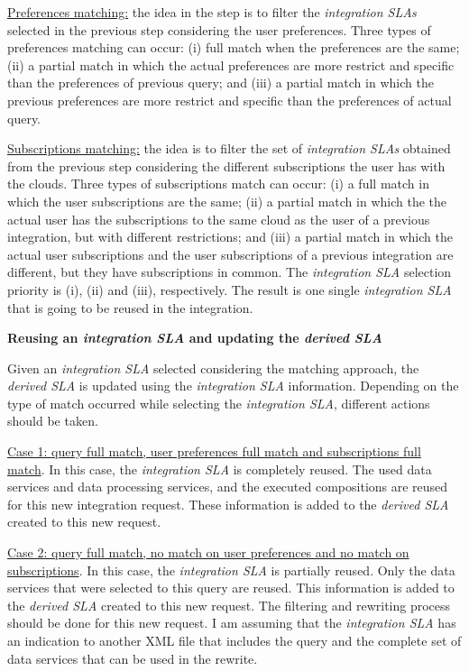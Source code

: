 \documentclass[10pt,a4paper,final]{report}
\begin{document}
\noindent \underline{Preferences matching:} the idea in the step is to filter the \textsl{integration SLAs} selected in the previous step considering the user preferences. Three types of preferences matching can occur: (i) full match when the preferences are the same; (ii) a partial match in which the actual preferences are more restrict and specific than the preferences of previous query; and (iii) a partial match in which the previous preferences are more restrict and specific than the preferences of actual query.
\bigskip

\noindent \underline{Subscriptions matching:} the idea is to filter the set of \textsl{integration SLAs} obtained from the previous step considering the different subscriptions the user has with the clouds. Three types of subscriptions match can occur: (i) a full match in which the user subscriptions are the same; (ii) a partial match in which the the actual user has the subscriptions to the same cloud as the user of a previous integration, but with different restrictions; and (iii) a partial match in which the actual user subscriptions and the user subscriptions of a previous integration are different, but they have subscriptions in common. The \textsl{integration SLA} selection priority is (i), (ii) and (iii), respectively. The result is one single \textsl{integration SLA} that is going to be reused in the integration.
\bigskip

\noindent \textbf{Reusing an \textsl{integration SLA} and updating the \textsl{derived SLA}}
\bigskip

Given an \textsl{integration SLA} selected considering the matching approach, the \textsl{derived SLA} is updated using the \textsl{integration SLA} information. Depending on the type of match occurred while selecting the \textsl{integration SLA}, different actions should be taken.
\bigskip

\noindent \underline{Case 1: query full match, user preferences full match and subscriptions full match}. In this case, the \textsl{integration SLA} is completely reused. The used data services and data processing services, and the executed compositions are reused for this new integration request. These information is added to the \textsl{derived SLA} created to this new request.
\bigskip

\noindent \underline{Case 2: query full match, no match on user preferences and no match on subscriptions}. In this case, the \textsl{integration SLA} is partially reused. Only the data services that were selected to this query are reused. This information is added to the \textsl{derived SLA} created to this new request. The filtering and rewriting process should be done for this new request. I am assuming that the \textsl{integration SLA} has an indication to another XML file that includes the query and the complete set of data services that can be used in the rewrite.
\bigskip
\end{document}
